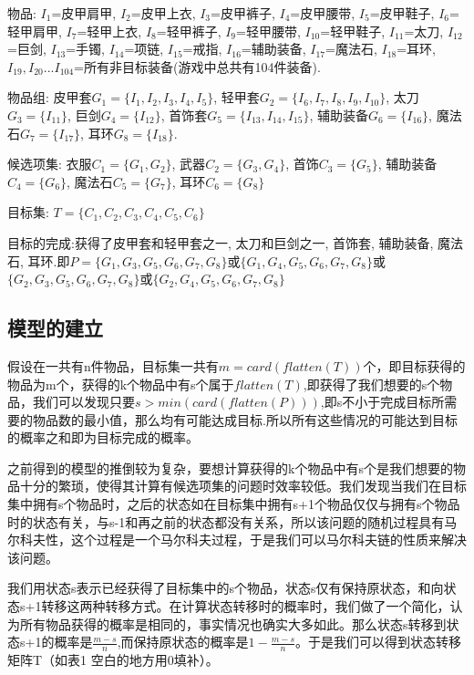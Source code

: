 \documentclass[10pt,journal,compsoc]{IEEEtran}
\begin{document}
  物品: $I_1$=皮甲肩甲, $I_2$=皮甲上衣, $I_3$=皮甲裤子, $I_4$=皮甲腰带, $I_5$=皮甲鞋子, $I_6$=轻甲肩甲, $I_7$=轻甲上衣, $I_8$=轻甲裤子, $I_9$=轻甲腰带, $I_{10}$=轻甲鞋子, $I_{11}$=太刀, $I_{12}$=巨剑, $I_{13}$=手镯, $I_{14}$=项链, $I_{15}$=戒指, $I_{16}$=辅助装备, $I_{17}$=魔法石, $I_{18}$=耳环, $I_{19},I_{20}...I_{104}$=所有非目标装备(游戏中总共有104件装备). 
  
  物品组: 皮甲套$G_1=\{I_1, I_2, I_3, I_4, I_5\}$, 轻甲套$G_2=\{I_6, I_7, I_8, I_9, I_{10}\}$, 太刀$G_3=\{I_{11}\}$, 巨剑$G_4=\{I_{12}\}$, 首饰套$G_5=\{I_{13}, I_{14}, I_{15}\}$, 辅助装备$G_6=\{I_{16}\}$, 魔法石$G_7=\{I_{17}\}$, 耳环$G_8=\{I_{18}\}$.

  候选项集: 衣服$C_1=\{G_1, G_2\}$, 武器$C_2=\{G_3, G_4\}$, 首饰$C_3=\{G_5\}$, 辅助装备$C_4=\{G_6\}$, 魔法石$C_5=\{G_7\}$, 耳环$C_6=\{G_8\}$

  目标集: $T=\{C_1, C_2, C_3, C_4, C_5, C_6\}$

  

  目标的完成:获得了皮甲套和轻甲套之一, 太刀和巨剑之一, 首饰套, 辅助装备, 魔法石, 耳环.即$P=\{G_{1}, G_{3}, G_{5}, G_{6}, G_{7}, G_{8}\}$或$\{G_{1}, G_{4}, G_{5}, G_{6}, G_{7}, G_{8}\}$或$\{G_{2}, G_{3}, G_{5}, G_{6}, G_{7}, G_{8}\}$或$\{G_{2}, G_{4}, G_{5}, G_{6}, G_{7}, G_{8}\}$


  \subsection{模型的建立}
  假设在一共有n件物品，目标集一共有$m = card(flatten(T))$个，即目标获得的物品为m个，获得的k个物品中有s个属于$flatten(T)$,即获得了我们想要的s个物品，我们可以发现只要$s>min(card(flatten(P)))$,即s不小于完成目标所需要的物品数的最小值，那么均有可能达成目标.所以所有这些情况的可能达到目标的概率之和即为目标完成的概率。 
  
  之前得到的模型的推倒较为复杂，要想计算获得的k个物品中有s个是我们想要的物品十分的繁琐，使得其计算有候选项集的问题时效率较低。我们发现当我们在目标集中拥有s个物品时，之后的状态如在目标集中拥有s+1个物品仅仅与拥有s个物品时的状态有关，与s-1和再之前的状态都没有关系，所以该问题的随机过程具有马尔科夫性，这个过程是一个马尔科夫过程，于是我们可以马尔科夫链的性质来解决该问题。

  我们用状态s表示已经获得了目标集中的s个物品，状态s仅有保持原状态，和向状态s+1转移这两种转移方式。在计算状态转移时的概率时，我们做了一个简化，认为所有物品获得的概率是相同的，事实情况也确实大多如此。那么状态s转移到状态s+1的概率是$\frac{m-s}{n}$,而保持原状态的概率是$1-\frac{m-s}{n}$。于是我们可以得到状态转移矩阵T（如表1 空白的地方用0填补）。
\end{document}
